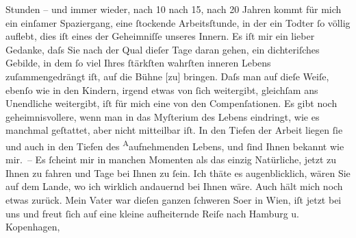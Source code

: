 \begin{ledgroupsized}[t]{13cm}
               Stunden – und immer wieder, nach 10 nach 15, nach 20 Jahren kommt für mich ein
               einſamer Spaziergang, eine ſtockende Arbeitsſtunde, in der ein Todter ſo völlig
               auflebt, dies iſt eines der Geheimniſſe unseres Innern.\pend
           \pstart
           Es iſt mir ein lieber Gedanke, daſs Sie nach der Qual dieſer Tage daran {\pb}gehen, ein dichteriſches Gebilde, in dem ſo viel Ihres ſtärkſten
               wahrſten inneren Lebens zuſammengedrängt iſt, auf die Bühne {[}zu{]}
               bringen. Daſs man auf dieſe Weiſe, ebenſo wie in den Kindern, irgend etwas von ſich
               weitergibt, gleichſam ans Unendliche weitergibt, iſt für mich eine von den
               Compenſationen. Es gibt noch geheimnisvollere, wenn man in das Myſterium des Lebens
               eindringt, wie es manchmal geſtattet, aber {\pb}nicht mitteilbar iſt. In den
               Tiefen der Arbeit liegen ſie und auch in den Tiefen des \substVorne{}\textsuperscript{A}\substDazwischen{}a\substHinten{}ufnehmenden Lebens, und ſind Ihnen bekannt wie mir. – Es ſcheint mir in
               manchen Momenten als das einzig Natürliche, jetzt zu Ihnen zu fahren und Tage bei
               Ihnen zu ſein. Ich thäte es augenblicklich, wären Sie auf dem Lande, wo ich wirklich
               andauernd bei Ihnen wäre.\pend
           \pstart
           Auch hält mich noch etwas zurück. Mein Vater war dieſen ganzen ſchweren So{\geminationm}er in Wien,
               iſt jetzt bei uns und freut ſich auf eine kleine aufheiternde Reiſe nach Hamburg u. Kopenhagen, \label{T_L02027_1v}
\end{ledgroupsized}
